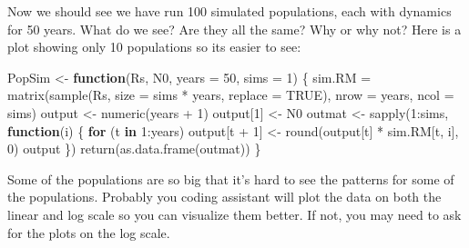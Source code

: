 \documentclass[
]{article}
\newenvironment{Shaded}{\begin{snugshade}}{\end{snugshade}}
\newcommand{\AttributeTok}[1]{\textcolor[rgb]{0.40,0.45,0.13}{#1}}
\newcommand{\ConstantTok}[1]{\textcolor[rgb]{0.56,0.35,0.01}{#1}}
\newcommand{\ControlFlowTok}[1]{\textcolor[rgb]{0.00,0.23,0.31}{\textbf{#1}}}
\newcommand{\DecValTok}[1]{\textcolor[rgb]{0.68,0.00,0.00}{#1}}
\newcommand{\FunctionTok}[1]{\textcolor[rgb]{0.28,0.35,0.67}{#1}}
\newcommand{\NormalTok}[1]{\textcolor[rgb]{0.00,0.23,0.31}{#1}}
\newcommand{\OtherTok}[1]{\textcolor[rgb]{0.00,0.23,0.31}{#1}}
\newcommand{\SpecialCharTok}[1]{\textcolor[rgb]{0.37,0.37,0.37}{#1}}
\begin{document}
Now we should see we have run 100 simulated populations, each with
dynamics for 50 years. What do we see? Are they all the same? Why or why
not? Here is a plot showing only 10 populations so its easier to see:

\begin{Shaded}
\begin{Highlighting}[]
\NormalTok{PopSim }\OtherTok{\textless{}{-}} \ControlFlowTok{function}\NormalTok{(Rs, N0, }\AttributeTok{years =} \DecValTok{50}\NormalTok{, }\AttributeTok{sims =} \DecValTok{1}\NormalTok{) \{}
\NormalTok{  sim.RM }\OtherTok{=} \FunctionTok{matrix}\NormalTok{(}\FunctionTok{sample}\NormalTok{(Rs, }\AttributeTok{size =}\NormalTok{ sims }\SpecialCharTok{*}\NormalTok{ years, }\AttributeTok{replace =} \ConstantTok{TRUE}\NormalTok{),}
                    \AttributeTok{nrow =}\NormalTok{ years, }\AttributeTok{ncol =}\NormalTok{ sims)}
\NormalTok{  output }\OtherTok{\textless{}{-}} \FunctionTok{numeric}\NormalTok{(years }\SpecialCharTok{+} \DecValTok{1}\NormalTok{)}
\NormalTok{  output[}\DecValTok{1}\NormalTok{] }\OtherTok{\textless{}{-}}\NormalTok{ N0}
\NormalTok{  outmat }\OtherTok{\textless{}{-}} \FunctionTok{sapply}\NormalTok{(}\DecValTok{1}\SpecialCharTok{:}\NormalTok{sims, }\ControlFlowTok{function}\NormalTok{(i) \{}
    \ControlFlowTok{for}\NormalTok{ (t }\ControlFlowTok{in} \DecValTok{1}\SpecialCharTok{:}\NormalTok{years) output[t }\SpecialCharTok{+} \DecValTok{1}\NormalTok{] }\OtherTok{\textless{}{-}} \FunctionTok{round}\NormalTok{(output[t] }\SpecialCharTok{*}\NormalTok{ sim.RM[t, i], }\DecValTok{0}\NormalTok{)}
\NormalTok{    output}
\NormalTok{    \})}
  \FunctionTok{return}\NormalTok{(}\FunctionTok{as.data.frame}\NormalTok{(outmat))}
\NormalTok{\}}
\end{Highlighting}
\end{Shaded}

Some of the populations are so big that it's hard to see the patterns
for some of the populations. Probably you coding assistant will plot the
data on both the linear and log scale so you can visualize them better.
If not, you may need to ask for the plots on the log scale.
\end{document}
